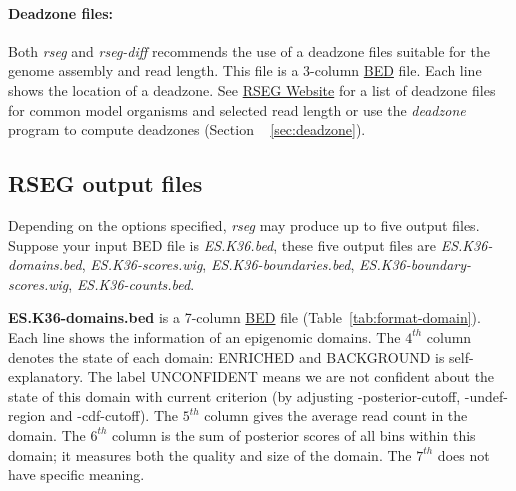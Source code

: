 \documentclass[11pt]{report}
\begin{document}
\paragraph{Deadzone files:} Both \textit{rseg} and \textit{rseg-diff}
recommends the use of a deadzone files suitable for the genome
assembly and read length. This file is a 3-column
\href{http://genome.ucsc.edu/FAQ/FAQformat.html#format1}{BED}
file. Each line shows the location of a deadzone. See
\href{http://smithlab.cmb.usc.edu/histone/software}{RSEG Website} for a list of
deadzone files for common model organisms and selected read length or
use the \textit{deadzone} program to compute deadzones
(Section ~ \ref{sec:deadzone}).
 
\subsection{RSEG output files}
\label{sec:rseg-output}

Depending on the options specified, \textit{rseg} may produce up to five output
files. Suppose your input BED file is \textit{ES.K36.bed}, these five output
files are \textit{ES.K36-domains.bed}, \textit{ES.K36-scores.wig},
\textit{ES.K36-boundaries.bed}, \textit{ES.K36-boundary-scores.wig},
\textit{ES.K36-counts.bed}.

\textbf{ES.K36-domains.bed} is a 7-column
\href{http://genome.ucsc.edu/FAQ/FAQformat.html#format1}{BED} file
(Table~\ref{tab:format-domain}). Each line shows the information of an
epigenomic domains. The $4^{th}$ column denotes the state of each domain:
ENRICHED and BACKGROUND is self-explanatory. The label UNCONFIDENT means we are
not confident about the state of this domain with current criterion (by
adjusting -posterior-cutoff, -undef-region and -cdf-cutoff). The $5^{th}$ column
gives the average read count in the domain. The $6^{th}$ column is the sum of
posterior scores of all bins within this domain; it measures both the quality
and size of the domain. The $7^{th}$ does not have specific meaning.
\end{document}
